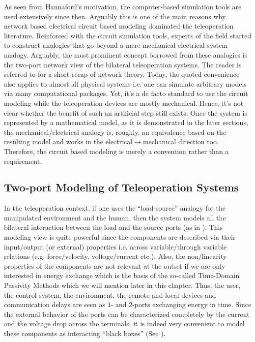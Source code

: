 As seen from Hannaford's motivation, the computer-based simulation tools are used extensively since then. Arguably
this is one of the main reasons why network based electrical circuit based modeling dominated the teleoperation literature. 
Reinforced with the circuit simulation tools, experts of the field started to construct analogies that go beyond
a mere mechanical-electrical system analogy. Arguably, the most prominent concept borrowed from these analogies is the two-port network 
view of the bilateral teleoperation systems. The reader is referred to  for a short recap of network theory.
Today, the quoted convenience also applies to almost all physical systems i.e. one can simulate arbitrary models via many 
computational packages. Yet, it's a de facto standard to use the circuit modeling while the teleoperation devices are mostly 
mechanical. Hence, it's not clear whether the benefit of such an artificial step still exists. Once the system is represented 
by a mathematical model, as it is demonstrated in the later sections, the mechanical/electrical analogy is, roughly, an equivalence
based on the resulting model and works in the electrical$\to$mechanical direction too. Therefore, the 
circuit based modeling is merely a convention rather than a requirement.

\subsection{Two-port Modeling of Teleoperation Systems}

In the teleoperation context, if one uses the \enquote{load-source} analogy for the manipulated environment 
and the human, then the system models all the bilateral interaction between the load and the source 
ports (as in ). This modeling view is quite powerful since the components are described via their input/output 
(or external) properties i.e. across variable/through variable relations (e.g. force/velocity, voltage/current etc.). Also, the non/linearity
properties of the components are not relevant at the outset if we are only interested in energy exchange which is the basis
of the so-called Time-Domain Passivity Methods \cite{hannafordryu} which we will mention later in this chapter. Thus, 
the user, the control system, the environment, the remote and local devices and communication delays are seen as 
$1$- and $2$-ports exchanging energy in time. Since the external behavior of the ports can be characterized completely by the 
current and the voltage drop across the terminals, it is indeed very convenient to model these components as 
interacting \enquote{black boxes} (See ).

